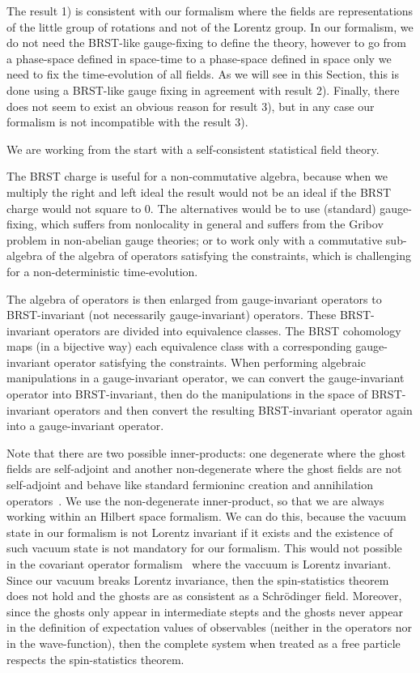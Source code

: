 \documentclass[11pt]{book}
\begin{document}
The result 1) is consistent with our formalism where the fields are
representations of the little group of rotations and not of the Lorentz
group. In our formalism, we do not need the BRST-like gauge-fixing to
define the theory, however to go from a phase-space defined in
space-time to a phase-space defined in space only we need to fix the
time-evolution of all fields. As we will see in this Section, this is
done using a BRST-like gauge fixing in agreement with result 2).
Finally, there does not seem to exist an obvious reason for result 3),
but in any case our formalism is not incompatible with the result 3).

We are working from the start with a self-consistent statistical field
theory.

The BRST charge is useful for a non-commutative algebra, because when we
multiply the right and left ideal the result would not be an ideal if
the BRST charge would not square to 0. The alternatives would be to use
(standard) gauge-fixing, which suffers from nonlocality in general and
suffers from the Gribov problem in non-abelian gauge theories; or to
work only with a commutative sub-algebra of the algebra of operators
satisfying the constraints, which is challenging for a non-deterministic
time-evolution.

The algebra of operators is then enlarged from gauge-invariant operators
to BRST-invariant (not necessarily gauge-invariant) operators. These
BRST-invariant operators are divided into equivalence classes. The BRST
cohomology maps (in a bijective way) each equivalence class with a
corresponding gauge-invariant operator satisfying the constraints. When
performing algebraic manipulations in a gauge-invariant operator, we can
convert the gauge-invariant operator into BRST-invariant, then do the
manipulations in the space of BRST-invariant operators and then convert
the resulting BRST-invariant operator again into a gauge-invariant
operator.

Note that there are two possible inner-products: one degenerate where
the ghost fields are self-adjoint and another non-degenerate where the
ghost fields are not self-adjoint and behave like standard fermioninc
creation and annihilation
operators~\cite{Van2005Aspects}. We
use the non-degenerate inner-product, so that we are always working
within an Hilbert space formalism. We can do this, because the vacuum
state in our formalism is not Lorentz invariant if it exists and the
existence of such vacuum state is not mandatory for our formalism. This
would not possible in the covariant operator
formalism~\cite{Nakanishi1990Covariant} where the vaccuum is Lorentz invariant. Since our vacuum
breaks Lorentz invariance, then the spin-statistics theorem does not
hold and the ghosts are as consistent as a Schrödinger field. Moreover,
since the ghosts only appear in intermediate stepts and the ghosts never
appear in the definition of expectation values of observables (neither
in the operators nor in the wave-function), then the complete system
when treated as a free particle respects the spin-statistics theorem.
\end{document}

